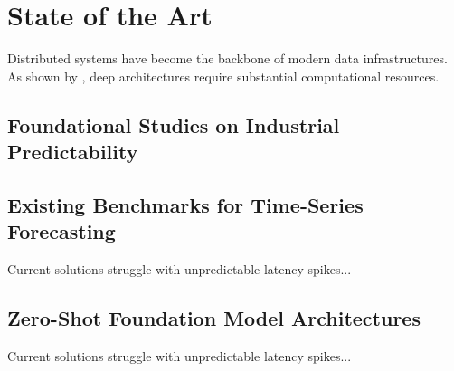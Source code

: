 \chapter{State of the Art}
\label{chap:stateofArt}

Distributed systems have become the backbone of modern data infrastructures. As shown by \textcite{vaswani2017attention}, deep architectures require substantial computational resources.


\section{Foundational Studies on Industrial Predictability}
\label{sec:foundationalStudies}



\section{Existing Benchmarks for Time-Series Forecasting}
\label{sec:TSFBenchmark}

Current solutions struggle with unpredictable latency spikes...


\section{Zero-Shot Foundation Model Architectures}
\label{sec:zsModelArchitecture}

Current solutions struggle with unpredictable latency spikes...
